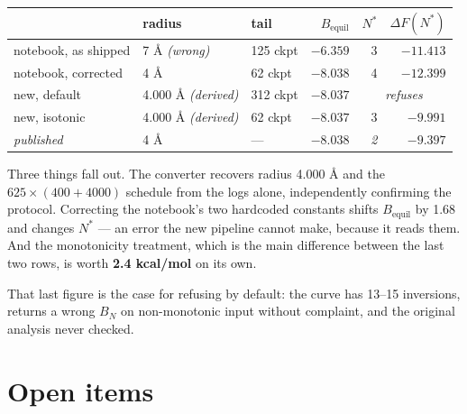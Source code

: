\documentclass[11pt]{article}
\newcommand{\code}[1]{\texttt{\detokenize{#1}}}
\begin{document}
\begin{center}\small
\begin{tabular}{@{}l l l r r r@{}}
\toprule
& radius & tail & $B_{\text{equil}}$ & $N^{*}$ & $\Delta F(N^{*})$ \\
\midrule
notebook, as shipped & 7 \AA{} \emph{(wrong)} & 125 ckpt & $-6.359$ & 3 & $-11.413$ \\
notebook, corrected & 4 \AA{} & 62 ckpt & $-8.038$ & 4 & $-12.399$ \\
new, default & 4.000 \AA{} \emph{(derived)} & 312 ckpt & $-8.037$ & \multicolumn{2}{c}{\emph{refuses}} \\
new, isotonic & 4.000 \AA{} \emph{(derived)} & 62 ckpt & $-8.037$ & 3 & $-9.991$ \\
\midrule
\emph{published} & 4 \AA{} & --- & $-8.038$ & \emph{2} & \emph{$-9.397$} \\
\bottomrule
\end{tabular}
\end{center}

Three things fall out. The converter recovers radius 4.000 \AA{} and the
$625\times(400+4000)$ schedule from the logs alone, independently confirming the
protocol. Correcting the notebook's two hardcoded constants shifts
$B_{\text{equil}}$ by 1.68 and changes $N^{*}$ --- an error the new pipeline cannot
make, because it reads them. And the monotonicity treatment, which is the main
difference between the last two rows, is worth \textbf{2.4 kcal/mol} on its own.

That last figure is the case for refusing by default: the curve has 13--15
inversions, \code{np.interp} returns a wrong $B_N$ on non-monotonic input without
complaint, and the original analysis never checked.

\section{Open items}
\end{document}
